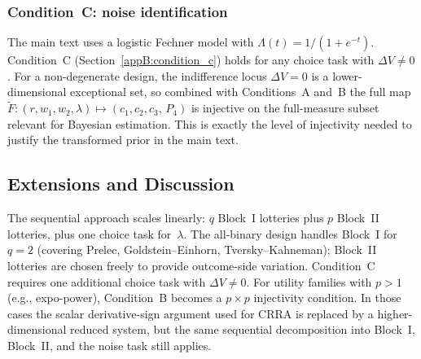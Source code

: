 \subsubsection{Condition~C: noise identification}
\label{appB:noise}

The main text uses a logistic Fechner model
with $\Lambda(t) = 1/(1 + e^{-t})$. Condition~C
(Section~\ref{appB:condition_c}) holds for any choice task with
$\Delta V \neq 0$. For a non-degenerate design, the indifference locus
$\Delta V = 0$ is a lower-dimensional exceptional set, so combined with
Conditions~A and~B the full map
$\widetilde{F} \colon (r, w_1, w_2, \lambda) \mapsto
(c_1, c_2, c_3,\, P_4)$ is injective on the full-measure subset relevant for
Bayesian estimation. This is exactly the level of injectivity needed to justify
the transformed prior in the main text.


\subsection{Extensions and Discussion}
\label{appB:inj_extensions}

The sequential approach scales linearly: $q$ Block~I lotteries plus
$p$ Block~II lotteries, plus one choice task for~$\lambda$.
The all-binary design handles Block~I for
$q = 2$ (covering Prelec, Goldstein--Einhorn, Tversky--Kahneman);
Block~II lotteries are chosen freely to provide outcome-side
variation. Condition~C requires one additional choice task with
$\Delta V \neq 0$.
For utility families with $p > 1$ (e.g., expo-power),
Condition~B becomes a $p \times p$ injectivity condition. In those cases the
scalar derivative-sign argument used for CRRA is replaced by a higher-dimensional
reduced system, but the same sequential decomposition into Block~I, Block~II,
and the noise task still applies.
